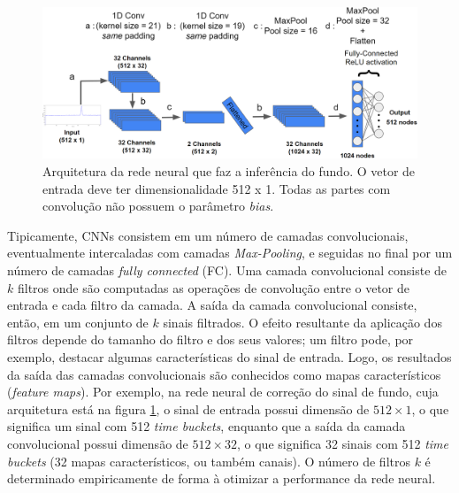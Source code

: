 \documentclass[a4paper,12pt,oneside]{book}
\begin{document}


\begin{figure}[H]
    \centering
    \includegraphics[scale = 0.238]{figs/Source to only bkg.png}
    \caption{Arquitetura da rede neural que faz a inferência do fundo. O vetor de entrada deve ter dimensionalidade 512 x 1. Todas as partes com convolução não possuem o parâmetro \textit{bias}.}
    \label{fig:arq_source_to_bkg}
\end{figure}

\par Tipicamente, CNNs consistem em um número de camadas convolucionais, eventualmente intercaladas com camadas \textit{Max-Pooling}, e seguidas no final por um número de camadas \textit{fully connected} (FC). Uma camada convolucional consiste de $k$ filtros onde são computadas as operações de convolução entre o vetor de entrada e cada filtro da camada. A saída da camada convolucional consiste, então, em um conjunto de $k$ sinais filtrados. O efeito resultante da aplicação dos filtros depende do tamanho do filtro e dos seus valores; um filtro pode, por exemplo, destacar algumas características do sinal de entrada. Logo, os resultados da saída das camadas convolucionais são conhecidos como mapas característicos (\textit{feature maps}). Por exemplo, na rede neural de correção do sinal de fundo, cuja arquitetura está na figura \ref{fig:arq_source_to_bkg}, o sinal de entrada possui dimensão de $512\times 1$, o que significa um sinal com 512 \textit{time buckets}, enquanto que a saída da camada convolucional possui dimensão de $512\times 32$, o que significa 32 sinais com 512 \textit{time buckets} (32 mapas característicos, ou também canais). O número de filtros $k$ é determinado empiricamente de forma à otimizar a performance da rede neural.
\end{document}
